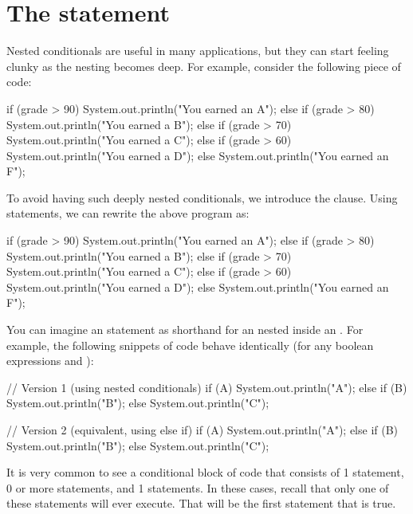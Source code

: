 \section{The  statement}
Nested conditionals are useful in many applications, but they can start feeling clunky as the nesting becomes deep. For example, consider the following piece of code:

\begin{code}
if (grade > 90) {
    System.out.println("You earned an A");
} else {
    if (grade > 80) {
        System.out.println("You earned a B");
    } else {
        if (grade > 70) {
            System.out.println("You earned a C");
        } else {
            if (grade > 60) {
                System.out.println("You earned a D");
            } else {
                System.out.println("You earned an F");
            }
        }
    }
}
\end{code}

\noindent To avoid having such deeply nested conditionals, we introduce the  clause. Using  statements, we can rewrite the above program as:

\begin{code}
if (grade > 90) {
    System.out.println("You earned an A");
} else if (grade > 80) {
    System.out.println("You earned a B");
} else if (grade > 70) {
    System.out.println("You earned a C");
} else if (grade > 60) {
    System.out.println("You earned a D");
} else {
    System.out.println("You earned an F");
}
\end{code}

You can imagine an  statement as shorthand for an  nested inside an . For example, the following snippets of code behave identically (for any boolean expressions  and ):

\begin{code}
// Version 1 (using nested conditionals)
if (A) {
    System.out.println("A");
} else {
    if (B) {
        System.out.println("B");
    } else {
        System.out.println("C");
    }
}

// Version 2 (equivalent, using else if)
if (A) {
    System.out.println("A");
} else if (B) {
    System.out.println("B");
} else {
    System.out.println("C");
}
\end{code}

It is very common to see a conditional block of code that consists of 1  statement, 0 or more  statements, and 1  statements. In these cases, recall that only one of these statements will ever execute. That will be the first statement that is true.

